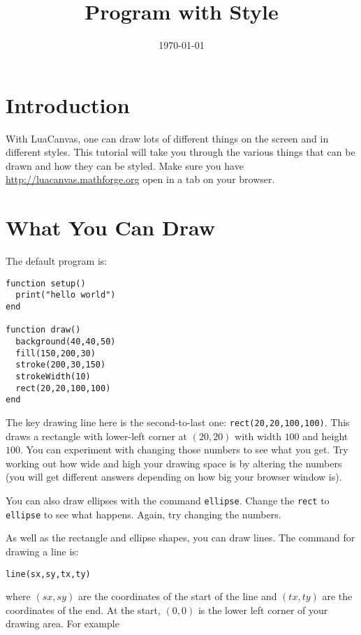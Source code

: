 \documentclass[
  xhtml,%
  use filename%
]{internet}
\title{Program with Style}
\date{\today}
\begin{document}
\maketitle

\section{Introduction}

With LuaCanvas, one can draw lots of different things on the screen and in different styles.
This tutorial will take you through the various things that can be drawn and how they can be styled.
Make sure you have \href{http://luacanvas.mathforge.org}{http://luacanvas.mathforge.org} open in a tab on your browser.

\section{What You Can Draw}

The default program is:

\begin{verbatim}
function setup()
  print("hello world")
end

function draw()
  background(40,40,50)
  fill(150,200,30)
  stroke(200,30,150)
  strokeWidth(10)
  rect(20,20,100,100)
end
\end{verbatim}

The key drawing line here is the second-to-last one: \verb+rect(20,20,100,100)+.
This draws a rectangle with lower-left corner at \((20,20)\) with width \(100\) and height \(100\).
You can experiment with changing those numbers to see what you get.
Try working out how wide and high your drawing space is by altering the numbers (you will get different answers depending on how big your browser window is).

You can also draw ellipses with the command \verb+ellipse+.
Change the \verb+rect+ to \verb+ellipse+ to see what happens.
Again, try changing the numbers.

As well as the rectangle and ellipse shapes, you can draw lines.
The command for drawing a line is:

\begin{verbatim}
line(sx,sy,tx,ty)
\end{verbatim}

\noindent where \((sx,sy)\) are the coordinates of the start of the line and \((tx,ty)\) are the coordinates of the end.
At the start, \((0,0)\) is the lower left corner of your drawing area.
For example
\end{document}
